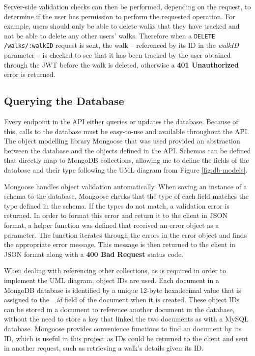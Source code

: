 Server-side validation checks can then be performed, depending on the request, to determine if the user has permission to perform the requested operation. For example, users should only be able to delete walks that they have tracked and not be able to delete any other users' walks. Therefore when a \verb|DELETE /walks/:walkID| request is sent, the walk -- referenced by its ID in the \textit{walkID} parameter -- is checked to see that it has been tracked by the user obtained through the JWT before the walk is deleted, otherwise a \textbf{401 Unauthorized} error is returned.

\subsection{Querying the Database}


Every endpoint in the API either queries or updates the database. Because of this, calls to the database must be easy-to-use and available throughout the API. The object modelling library Mongoose that was used provided an abstraction between the database and the objects defined in the API. Schemas can be defined that directly map to MongoDB collections, allowing me to define the fields of the database and their type following the UML diagram from Figure \ref{fig:db-models}.

Mongoose handles object validation automatically. When saving an instance of a schema to the database, Mongoose checks that the type of each field matches the type defined in the schema. If the types do not match, a validation error is returned. In order to format this error and return it to the client in JSON format, a helper function was defined that received an error object as a parameter. The function iterates through the errors in the error object and finds the appropriate error message. This message is then returned to the client in JSON format along with a \textbf{400 Bad Request} status code.

When dealing with referencing other collections, as is required in order to implement the UML diagram, object IDs are used. Each document in a MongoDB database is identified by a unique 12-byte hexadecimal value that is assigned to the \textit{\_id} field of the document when it is created. These object IDs can be stored in a document to reference another document in the database, without the need to store a key that linked the two documents as with a MySQL database. Mongoose provides convenience functions to find an document by its ID, which is useful in this project as IDs could be returned to the client and sent in another request, such as retrieving a walk's details given its ID.

